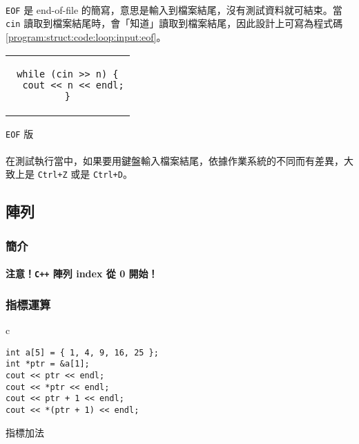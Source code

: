 \documentclass[12pt,a4paper,oneside]{report}
\begin{document}
\begin{CJK}{UTF8}{bkai}
\paragraph{}\texttt{EOF} 是 end-of-file 的簡寫，意思是輸入到檔案結尾，沒有測試資料就可結束。當 \lstinline!cin! 讀取到檔案結尾時，會「知道」讀取到檔案結尾，因此設計上可寫為程式碼 \ref{program:struct:code:loop:input:eof}。

\begin{code}[h!]
\centering
\begin{tabular}{c}
\begin{lstlisting}
while (cin >> n) {
  cout << n << endl;
}
\end{lstlisting}
\end{tabular}
\caption{\texttt{EOF} 版}
\label{program:struct:code:loop:input:eof}
\end{code}

\paragraph{}在測試執行當中，如果要用鍵盤輸入檔案結尾，依據作業系統的不同而有差異，大致上是 \texttt{Ctrl+Z} 或是 \texttt{Ctrl+D}。

\subsection{陣列}

\subsubsection{簡介}

\paragraph{}\textbf{{\color{red}注意！}\lstinline!C++! 陣列 index 從 0 開始！}

\subsubsection{指標運算}

\begin{code}[h!]
\centering
\begin{tabular}{c}
\begin{lstlisting}
int a[5] = { 1, 4, 9, 16, 25 };
int *ptr = &a[1];
cout << ptr << endl;
cout << *ptr << endl;
cout << ptr + 1 << endl;
cout << *(ptr + 1) << endl;
\end{lstlisting}
\end{tabular}
\caption{指標加法}
\label{program:struct:code:array:pointer:addition}
\end{code}


\end{CJK}
\end{document}
